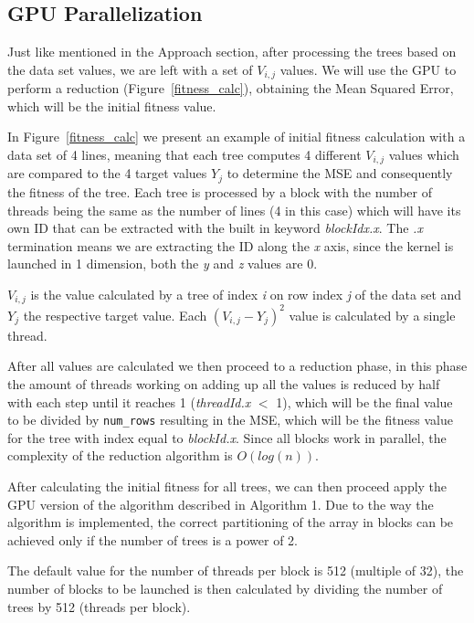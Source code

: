\documentclass[runningheads]{llncs}
\begin{document}
\subsection{GPU Parallelization}
Just like mentioned in the Approach section, after processing the trees based on the data set values, we are left with a set of $V_{i,j}$ values. We will use the GPU to perform a reduction (Figure~\ref{fitness_calc}), obtaining the Mean Squared Error, which will be the initial fitness value.

In Figure~\ref{fitness_calc} we present an example of initial fitness calculation with a data set of 4 lines, meaning that each tree computes 4 different $V_{i,j}$ values which are compared to the 4 target values $Y_j$ to determine the MSE and consequently the fitness of the tree. Each tree is processed by a block with the number of threads being the same as the number of lines (4 in this case) which will have its own ID that can be extracted with the built in keyword \textit{blockIdx.x}. The \textit{.x} termination means we are extracting the ID along the \textit{x} axis, since the kernel is launched in 1 dimension, both the \textit{y} and \textit{z} values are 0.

$V_{i,j}$ is the value calculated by a tree of index \textit{i} on row index \textit{j} of the data set and $Y_{j}$ the respective target value. Each $(V_{i,j} - Y_{j})^{2}$ value is calculated by a single thread.

After all values are calculated we then proceed to a reduction phase, in this phase the amount of threads working on adding up all the values is reduced by half with each step until it reaches 1 (\textit{threadId.x} $<$ 1), which will be the final value to be divided by \texttt{num\_rows} resulting in the MSE, which will be the fitness value for the tree with index equal to \textit{blockId.x}. Since all blocks work in parallel, the complexity of the reduction algorithm is $O(log(n))$.

After calculating the initial fitness for all trees, we can then proceed apply the GPU version of the algorithm described in Algorithm 1. Due to the way the algorithm is implemented, the correct partitioning of the array in blocks can be achieved only if the number of trees is a power of 2.

The default value for the number of threads per block is 512 (multiple of 32), the number of blocks to be launched is then calculated by dividing the number of trees by 512 (threads per block).
\end{document}
